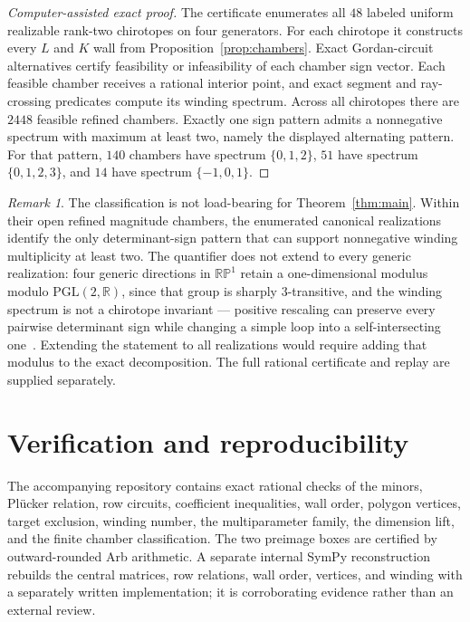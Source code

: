 \documentclass[11pt]{article}
\theoremstyle{remark}
\newtheorem{remark}[theorem]{Remark}
\newcommand{\R}{\mathbb R}
\begin{document}
\begin{proof}[Computer-assisted exact proof]
The certificate enumerates all $48$ labeled uniform realizable rank-two chirotopes on four generators. For each chirotope it constructs every $L$ and $K$ wall from Proposition~\ref{prop:chambers}. Exact Gordan-circuit alternatives certify feasibility or infeasibility of each chamber sign vector. Each feasible chamber receives a rational interior point, and exact segment and ray-crossing predicates compute its winding spectrum. Across all chirotopes there are $2448$ feasible refined chambers. Exactly one sign pattern admits a nonnegative spectrum with maximum at least two, namely the displayed alternating pattern. For that pattern, $140$ chambers have spectrum $\{0,1,2\}$, $51$ have spectrum $\{0,1,2,3\}$, and $14$ have spectrum $\{-1,0,1\}$.
\end{proof}

\begin{remark}
The classification is not load-bearing for Theorem~\ref{thm:main}. Within their open refined magnitude chambers, the enumerated canonical realizations identify the only determinant-sign pattern that can support nonnegative winding multiplicity at least two. The quantifier does not extend to every generic realization: four generic directions in $\mathbb{RP}^1$ retain a one-dimensional modulus modulo $\mathrm{PGL}(2,\R)$, since that group is sharply $3$-transitive, and the winding spectrum is not a chirotope invariant --- positive rescaling can preserve every pairwise determinant sign while changing a simple loop into a self-intersecting one~\cite[Prop.~7.5]{DixonPolygon}. Extending the statement to all realizations would require adding that modulus to the exact decomposition. The full rational certificate and replay are supplied separately.
\end{remark}

\section{Verification and reproducibility}
The accompanying repository contains exact rational checks of the minors, Pl\"ucker relation, row circuits, coefficient inequalities, wall order, polygon vertices, target exclusion, winding number, the multiparameter family, the dimension lift, and the finite chamber classification. The two preimage boxes are certified by outward-rounded Arb arithmetic. A separate internal SymPy reconstruction rebuilds the central matrices, row relations, wall order, vertices, and winding with a separately written implementation; it is corroborating evidence rather than an external review.
\end{document}
